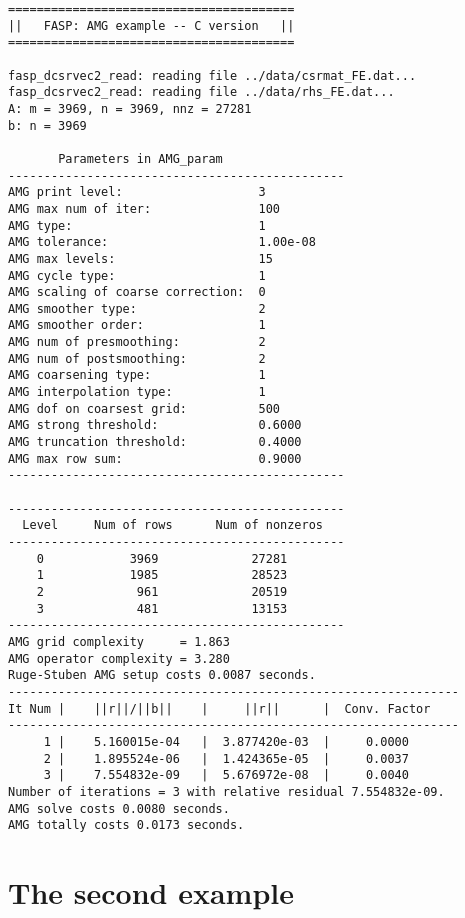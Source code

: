 \documentclass[11pt]{memoir}
\begin{document}
\begin{lstlisting}[numbers=none]
========================================
||   FASP: AMG example -- C version   ||
========================================

fasp_dcsrvec2_read: reading file ../data/csrmat_FE.dat...
fasp_dcsrvec2_read: reading file ../data/rhs_FE.dat...
A: m = 3969, n = 3969, nnz = 27281
b: n = 3969

       Parameters in AMG_param
-----------------------------------------------
AMG print level:                   3
AMG max num of iter:               100
AMG type:                          1
AMG tolerance:                     1.00e-08
AMG max levels:                    15
AMG cycle type:                    1
AMG scaling of coarse correction:  0
AMG smoother type:                 2
AMG smoother order:                1
AMG num of presmoothing:           2
AMG num of postsmoothing:          2
AMG coarsening type:               1
AMG interpolation type:            1
AMG dof on coarsest grid:          500
AMG strong threshold:              0.6000
AMG truncation threshold:          0.4000
AMG max row sum:                   0.9000
-----------------------------------------------

-----------------------------------------------
  Level     Num of rows      Num of nonzeros
-----------------------------------------------
    0            3969             27281
    1            1985             28523
    2             961             20519
    3             481             13153
-----------------------------------------------
AMG grid complexity     = 1.863
AMG operator complexity = 3.280
Ruge-Stuben AMG setup costs 0.0087 seconds.
---------------------------------------------------------------
It Num |    ||r||/||b||    |     ||r||      |  Conv. Factor
---------------------------------------------------------------
     1 |    5.160015e-04   |  3.877420e-03  |     0.0000
     2 |    1.895524e-06   |  1.424365e-05  |     0.0037
     3 |    7.554832e-09   |  5.676972e-08  |     0.0040
Number of iterations = 3 with relative residual 7.554832e-09.
AMG solve costs 0.0080 seconds.
AMG totally costs 0.0173 seconds.
\end{lstlisting}



\section{The second example}\label{sec:ex2}
\end{document}
